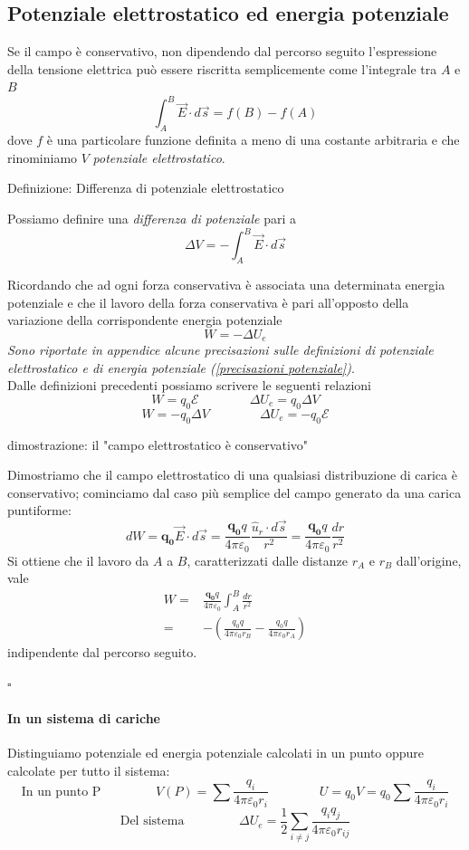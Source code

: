 \documentclass[x11names]{report}
\newcommand*{\QEDB}{\null\nobreak\hfill\ensuremath{\square}}%
\newcommand{\definizione}[2]{
	\begin{center}
		\fboxsep11pt
		\colorbox{myblue}{\begin{minipage}{5.75in}
				\begin{blues}{Definizione: #1}
					#2
				\end{blues}
		\end{minipage}}
	\end{center}
}
\newcommand{\dimostrazione}[2]{
	\begin{dym}{dimostrazione#1}
		#2
		\QEDB
	\end{dym}
}
\begin{document}
\subsection{Potenziale elettrostatico ed energia potenziale}
Se il campo è conservativo, non dipendendo dal percorso  seguito l'espressione della tensione elettrica può essere riscritta semplicemente come l'integrale tra \(A\) e \(B\) 
\[
\int_{A}^B\vec{E}\cdot d\vec{s} = f(B) - f(A)
\]
dove \(f\) è una particolare funzione definita a meno di una costante arbitraria e che rinominiamo \(V\) \textit{potenziale elettrostatico}. 
\definizione{Differenza di potenziale elettrostatico}{
Possiamo definire una \textit{differenza di potenziale} pari a 
\begin{equation}
\Delta V = - \int_{A}^B\vec{E}\cdot d\vec{s} 
\end{equation}
}
Ricordando che ad ogni forza conservativa è associata una determinata energia potenziale e che il lavoro della forza conservativa è pari all'opposto della variazione della corrispondente energia potenziale
\[
W = -\Delta U_e
\]
\textit{Sono riportate in appendice alcune precisazioni sulle definizioni di potenziale elettrostatico e di energia potenziale (\ref{precisazioni potenziale})}. \\


\noindent
Dalle definizioni precedenti possiamo scrivere le seguenti relazioni
\[
W = q_0 \mathcal{E}  \qquad\qquad \Delta U_e = q_0 \Delta V
\]
\[
W = -q_0 \Delta V \qquad\qquad  \Delta U_e = - q_0 \mathcal{E}
\]

\dimostrazione{: il "campo elettrostatico è conservativo"}{
	Dimostriamo che il campo elettrostatico di una qualsiasi distribuzione di carica è conservativo; cominciamo dal caso più semplice del campo generato da una carica puntiforme:
	\[
	dW = \boldsymbol{q_0}\vec{E} \cdot d\vec{s} = \frac{\boldsymbol{q_0}q}{4\pi\varepsilon_0} \frac{\hat{u}_r \cdot d\vec{s}}{r^2} =  \frac{\boldsymbol{q_0}q}{4\pi\varepsilon_0} \frac{dr}{r^2}
	\]
	Si ottiene che il lavoro da \(A\) a \(B\), caratterizzati dalle distanze \(r_A\) e \(r_B\) dall'origine, vale
	\begin{align*}\label{sviluppo lavoro}
		W =&  \frac{\boldsymbol{q_0}q}{4\pi\varepsilon_0} \int_A^B  \frac{dr}{r^2} \\
		=& -\left(\frac{q_0 q}{4\pi \varepsilon_0 r_B} - \frac{q_0 q}{4\pi \varepsilon_0 r_A}\right)
	\end{align*}
	indipendente dal percorso seguito.
}

\paragraph{In un sistema di cariche}
Distinguiamo potenziale ed energia potenziale calcolati in un punto oppure calcolate per tutto il sistema:
\[
	\text{In un punto P }  \qquad\qquad V(P) = \sum \frac{q_i}{4\pi \varepsilon_0 r_i} \qquad \qquad U = q_0V = q_0 \sum \frac{q_i}{4\pi \varepsilon_0 r_i} 
\]
\[
	\text{Del sistema } \qquad\qquad  \Delta U_e =  \frac{1}{2}\sum_{i\neq j} \frac{q_iq_j}{4\pi \varepsilon_0 r_{ij}} 
\]
\end{document}
